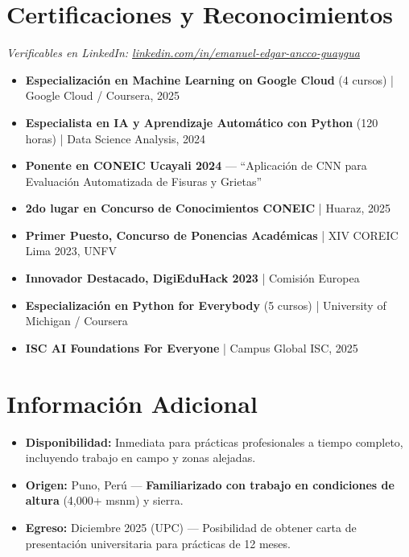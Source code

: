 \documentclass[10pt, a4paper]{article}
\begin{document}
\section*{Certificaciones y Reconocimientos}
\textit{\small Verificables en LinkedIn: \href{https://www.linkedin.com/in/emanuel-edgar-ancco-guaygua-a61210352}{linkedin.com/in/emanuel-edgar-ancco-guaygua}}
\vspace{1mm}
\begin{itemize}
    \item \textbf{Especialización en Machine Learning on Google Cloud} (4 cursos) | Google Cloud / Coursera, 2025
    \item \textbf{Especialista en IA y Aprendizaje Automático con Python} (120 horas) | Data Science Analysis, 2024
    \item \textbf{Ponente en CONEIC Ucayali 2024} — ``Aplicación de CNN para Evaluación Automatizada de Fisuras y Grietas''
    \item \textbf{2do lugar en Concurso de Conocimientos CONEIC} | Huaraz, 2025
    \item \textbf{Primer Puesto, Concurso de Ponencias Académicas} | XIV COREIC Lima 2023, UNFV
    \item \textbf{Innovador Destacado, DigiEduHack 2023} | Comisión Europea
    \item \textbf{Especialización en Python for Everybody} (5 cursos) | University of Michigan / Coursera
    \item \textbf{ISC AI Foundations For Everyone} | Campus Global ISC, 2025
\end{itemize}

\section*{Información Adicional}
\begin{itemize}
    \item \textbf{Disponibilidad:} Inmediata para prácticas profesionales a tiempo completo, incluyendo trabajo en campo y zonas alejadas.
    \item \textbf{Origen:} Puno, Perú — \textbf{Familiarizado con trabajo en condiciones de altura} (4,000+ msnm) y sierra.
    \item \textbf{Egreso:} Diciembre 2025 (UPC) — Posibilidad de obtener carta de presentación universitaria para prácticas de 12 meses.
\end{itemize}
\end{document}
